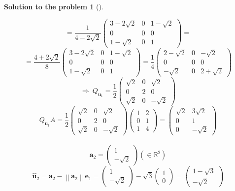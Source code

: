 \documentclass[12pt,a4]{article}
\newtheorem{solution}{Solution to the problem}
\newcommand{\ba}{{\mathbf a}}
\newcommand{\be}{{\mathbf e}}
\newcommand{\bu}{{\mathbf u}}
\newcommand{\norm}[1]{\left\lVert#1\right\rVert}
\begin{document}
\begin{solution}[]
\begin{enumerate}[(a)]
\[=
\frac{1}{4 - 2\sqrt 2}
\begin{pmatrix}
3 - 2\sqrt 2 & 0 & 1 - \sqrt 2\\
0 & 0 & 0 \\
1 - \sqrt 2 & 0  & 1 
\end{pmatrix} =
\]\[
=
\frac{4 + 2\sqrt 2}{8}
\begin{pmatrix}
3 - 2\sqrt 2 & 0 & 1 - \sqrt 2\\
0 & 0 & 0 \\
1 - \sqrt 2 & 0  & 1 
\end{pmatrix}
=
\frac{1}{4}
\begin{pmatrix}
2 - \sqrt 2 & 0 & - \sqrt 2\\
0 & 0 & 0 \\
- \sqrt 2 & 0  & 2 + \sqrt 2
\end{pmatrix}
\]
\[
\Rightarrow ~
Q_{\bu_1} =
\frac{1}{2}
\begin{pmatrix}
\sqrt 2 & 0 & \sqrt 2\\
0 & 2 & 0 \\
\sqrt 2 & 0  & -\sqrt 2
\end{pmatrix}
\]
\[
Q_{\bu_1} A = 
\frac{1}{2}
\begin{pmatrix}
\sqrt 2 & 0 & \sqrt 2\\
0 & 2 & 0 \\
\sqrt 2 & 0  & -\sqrt 2
\end{pmatrix}
\begin{pmatrix}
1 & 2 \\
0 & 1 \\
1 & 4 \end{pmatrix}
=
\begin{pmatrix}
\sqrt 2 & 3\sqrt 2\\
0 & 1 \\
0 & -\sqrt 2
\end{pmatrix}
\]\\
\[
\ba_2 = \begin{pmatrix} 1 \\ -\sqrt 2  \end{pmatrix} (\in \mathbb{R}^2)
\]
\[
\hat \bu_2 = \ba_2 - \norm{\ba_2} \be_1 = 
\begin{pmatrix} 1 \\ -\sqrt 2  \end{pmatrix}
-
\sqrt 3
\begin{pmatrix} 1 \\ 0  \end{pmatrix}
=
\begin{pmatrix} 1 - \sqrt 3 \\ - \sqrt 2  \end{pmatrix}
\]
\end{enumerate}
\end{solution}
\end{document}
